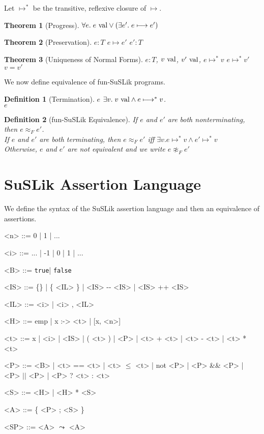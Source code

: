 \documentclass[10pt]{article}
\newtheorem{theorem}{Theorem}
\newtheorem{definition}{Definition}
\newcommand{\ttt}[1]{\texttt{#1}}
\newcommand{\reduces}{\ensuremath{\longmapsto}}
\newcommand{\reducestr}{\ensuremath{\longmapsto^{*}}}
\newcommand{\val}{\textnormal{ val}}
\newcommand{\true}{\ttt{true}}
\newcommand{\false}{\ttt{false}}
\begin{document}
\noindent
Let $\reducestr$ be the transitive, reflexive closure of $\reduces$.

\begin{theorem}[Progress]
  $\forall e.\; e \val \lor (\exists e'.\; e \reduces e')$
\end{theorem}

\begin{theorem}[Preservation]
   $e : T$  $e \reduces e'$  $e' : T$
\end{theorem}

\begin{theorem}[Uniqueness of Normal Forms]
   $e : T$, $v \val$, $v' \val$, $e \reducestr v$  $e \reducestr v'$  $v = v'$
\end{theorem}

\noindent
We now define equivalence of fun-SuSLik programs.

\begin{definition}[Termination]
  $e$  $\exists v.\; v \val \land e \reducestr v$.\\
  $e$ 
\end{definition}

\begin{definition}[fun-SuSLik Equivalence]
  If $e$ and $e'$ are both nonterminating, then $e \approx_F e'$.\\
  If $e$ and $e'$ are both terminating, then $e \approx_F e'$ iff $\exists v. e \reducestr v \land e' \reducestr v$\\
  Otherwise, $e$ and $e'$ are not equivalent and we write $e \not\approx_F e'$
\end{definition}

\section{SuSLik Assertion Language}

We define the syntax of the SuSLik assertion language and then an equivalence of assertions.

\begin{grammar}
  <n> ::= 0 | 1 | ...

  <i> ::= ... | -1 | 0 | 1 | ...

  <B> ::= \true | \false

  <IS> ::= \{\} | \{ <IL> \} | <IS> -{}- <IS> | <IS> ++ <IS>

  <IL> ::= <i> | <i> , <IL>

  <H> ::= emp | x :-> <t> | [x, <n>]

  <t> ::= x | <i> | <IS> | ( <t> ) | <P> | <t> + <t> | <t> - <t> | <t> * <t>

  <P> ::= <B> | <t> == <t> | <t> $\le$ <t> | not <P> | <P> \&\& <P> | <P> $||$ <P> | <P> ? <t> : <t>

  <S> ::= <H> | <H> * <S>

  <A> ::= \{ <P> ; <S> \}

  <SP> ::= <A> $\leadsto$ <A>
\end{grammar}
\end{document}
